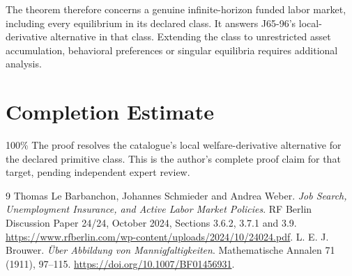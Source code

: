 \documentclass[11pt]{article}
\begin{document}
The theorem therefore concerns a genuine infinite-horizon funded labor market, including every equilibrium in its declared class. It answers J65-96's local-derivative alternative in that class. Extending the class to unrestricted asset accumulation, behavioral preferences or singular equilibria requires additional analysis.

\section*{Completion Estimate}
100\%
The proof resolves the catalogue's local welfare-derivative alternative
for the declared primitive class. This is the author's complete proof
claim for that target, pending independent expert review.

\begin{thebibliography}{9}
 Thomas Le Barbanchon, Johannes Schmieder and Andrea Weber.
\emph{Job Search, Unemployment Insurance, and Active Labor Market Policies}.
RF Berlin Discussion Paper 24/24, October 2024, Sections 3.6.2, 3.7.1 and 3.9.
\url{https://www.rfberlin.com/wp-content/uploads/2024/10/24024.pdf}.
 L. E. J. Brouwer.
\emph{\"Uber Abbildung von Mannigfaltigkeiten}.
Mathematische Annalen 71 (1911), 97--115.
\url{https://doi.org/10.1007/BF01456931}.
\end{thebibliography}
\end{document}
